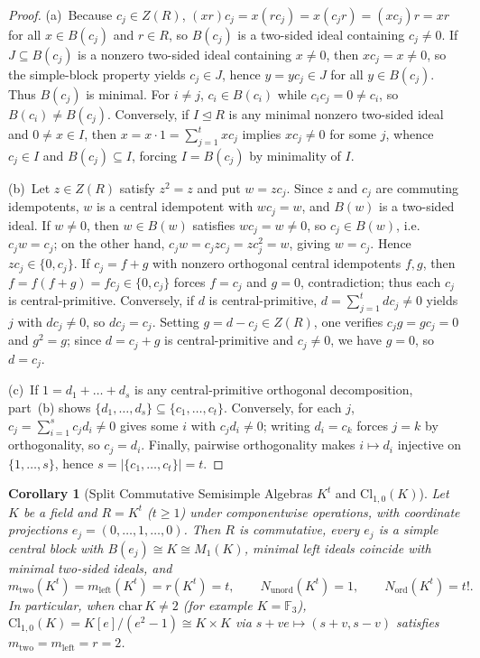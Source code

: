\documentclass[11pt]{article}
\newtheorem{corollary}[theorem]{Corollary}
\theoremstyle{definition}
\newcommand{\Cl}{\mathrm{Cl}}
\newcommand{\Mat}{M}
\newcommand{\F}{\mathbb{F}}
\begin{document}
\begin{proof}
(a)~Because $c_j \in Z(R)$, $(xr)c_j = x(rc_j) = x(c_j r) = (xc_j)r = xr$ for
all $x \in B(c_j)$ and $r \in R$, so $B(c_j)$ is a two-sided ideal containing
$c_j \neq 0$. If $J \subseteq B(c_j)$ is a nonzero two-sided ideal containing
$x \neq 0$, then $xc_j = x \neq 0$, so the simple-block property yields
$c_j \in J$, hence $y = yc_j \in J$ for all $y \in B(c_j)$. Thus $B(c_j)$ is
minimal. For $i \neq j$, $c_i \in B(c_i)$ while $c_i c_j = 0 \neq c_i$, so
$B(c_i) \neq B(c_j)$. Conversely, if $I \trianglelefteq R$ is any minimal
nonzero two-sided ideal and $0 \neq x \in I$, then
$x = x \cdot 1 = \sum_{j=1}^t xc_j$ implies $xc_j \neq 0$ for some $j$, whence
$c_j \in I$ and $B(c_j) \subseteq I$, forcing $I = B(c_j)$ by minimality of $I$.

(b)~Let $z \in Z(R)$ satisfy $z^2 = z$ and put $w = zc_j$. Since $z$ and $c_j$
are commuting idempotents, $w$ is a central idempotent with $wc_j = w$, and
$B(w)$ is a two-sided ideal. If $w \neq 0$, then $w \in B(w)$ satisfies
$wc_j = w \neq 0$, so $c_j \in B(w)$, i.e.\ $c_j w = c_j$; on the other hand,
$c_j w = c_j z c_j = z c_j^2 = w$, giving $w = c_j$. Hence $zc_j \in \{0, c_j\}$.
If $c_j = f + g$ with nonzero orthogonal central idempotents $f, g$, then
$f = f(f+g) = fc_j \in \{0, c_j\}$ forces $f = c_j$ and $g = 0$, contradiction;
thus each $c_j$ is central-primitive. Conversely, if $d$ is central-primitive,
$d = \sum_{j=1}^t dc_j \neq 0$ yields $j$ with $dc_j \neq 0$, so $dc_j = c_j$.
Setting $g = d - c_j \in Z(R)$, one verifies $c_j g = g c_j = 0$ and $g^2 = g$;
since $d = c_j + g$ is central-primitive and $c_j \neq 0$, we have $g = 0$, so
$d = c_j$.

(c)~If $1 = d_1 + \dots + d_s$ is any central-primitive orthogonal decomposition,
part~(b) shows $\{d_1, \dots, d_s\} \subseteq \{c_1, \dots, c_t\}$. Conversely,
for each $j$, $c_j = \sum_{i=1}^s c_j d_i \neq 0$ gives some $i$ with
$c_j d_i \neq 0$; writing $d_i = c_k$ forces $j = k$ by orthogonality, so
$c_j = d_i$. Finally, pairwise orthogonality makes $i \mapsto d_i$ injective on
$\{1, \dots, s\}$, hence $s = |\{c_1, \dots, c_t\}| = t$.
\end{proof}

\begin{corollary}[Split Commutative Semisimple Algebras $K^t$ and $\Cl_{1,0}(K)$]
\label{cor:split-comm}
Let $K$ be a field and $R = K^t$ ($t \ge 1$) under componentwise operations,
with coordinate projections $e_j = (0,\dots,1,\dots,0)$. Then $R$ is
commutative, every $e_j$ is a simple central block with $B(e_j) \cong K \cong
\Mat_1(K)$, minimal left ideals coincide with minimal two-sided ideals, and
\[
  m_{\mathrm{two}}(K^t) = m_{\mathrm{left}}(K^t) = r(K^t) = t,
  \qquad N_{\mathrm{unord}}(K^t) = 1, \qquad N_{\mathrm{ord}}(K^t) = t!.
\]
In particular, when $\mathrm{char}\,K \neq 2$ (for example $K = \F_3$),
$\Cl_{1,0}(K) = K[e]/(e^2 - 1) \cong K \times K$ via $s + ve \mapsto (s+v, s-v)$
satisfies $m_{\mathrm{two}} = m_{\mathrm{left}} = r = 2$.
\end{corollary}
\end{document}
